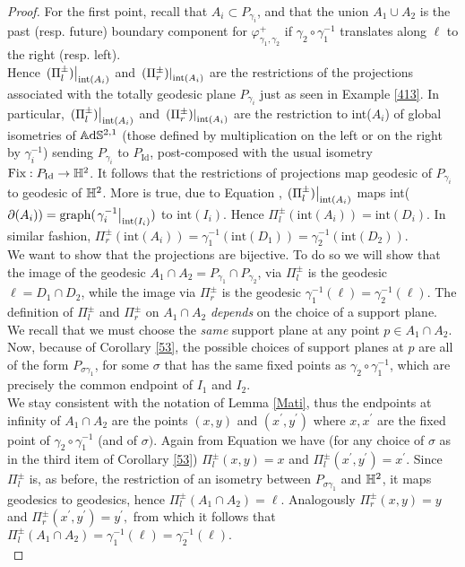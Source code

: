 \begin{proof}
    For the first point, recall that $A_i\subset P_{\gamma_i}$, and that the union $A_1\cup A_2$ is the past (resp. future) boundary component for $\varphi_{\gamma_1,\gamma_2}^+$ if $\gamma_2\circ\gamma_1^{-1}$ translates along $\ell$ to the right (resp. left). \\
    Hence $\left.(\Pi_l^\pm)\right|_{\text{int}(A_i)}$ and $\left.(\Pi_r^\pm)\right|_{\text{int}(A_i)}$ are the restrictions of the projections associated with the totally geodesic plane $P_{\gamma_i}$ just as seen in Example \ref{413}. In particular, $\left.(\Pi_l^\pm)\right|_{\text{int}(A_i)}$ and $\left.(\Pi_r^\pm)\right|_{\text{int}(A_i)}$ are the restriction to int($A_i$) of global isometries of $\mathbb{A}\mathrm{d}\mathbb{S}^{2,1}$ (those defined by multiplication on the left or on the right by $\gamma_i^{-1}$) sending $P_{\gamma_i}$ to $P_{\text{Id}}$, post-composed with the usual isometry $\text{Fix}:P_{\text{Id}}\to\mathbb{H}^2$. It follows that the restrictions of projections map geodesic of $P_{\gamma_i}$ to geodesic of $\mathbb{H}^2$. More is true, due to Equation , $\left.(\Pi_l^\pm)\right|_{\text{int}(A_i)}$ maps int($\partial(A_i))=\text{graph(\ensuremath{\left.\gamma_i^{-1}\right|_{\text{int}(I_i)}})}$ to $\text{int}(I_i).$ Hence $\Pi_l^\pm(\text{int}(A_i))=\text{int}(D_i)$. In similar fashion, $\Pi_r^\pm(\text{int}(A_i))=\gamma_1^{-1}(\text{int}(D_1))=\gamma_2^{-1}(\text{int}(D_2)).$\\
 We want to show that the projections are bijective. To do so we will show that the image of the geodesic $A_1\cap A_2=P_{\gamma_1}\cap P_{\gamma_2}$, via $\Pi_l^\pm$ is the geodesic $\ell=D_{1}\cap D_2$, while the image via $\Pi_r^\pm$ is the geodesic $\gamma_1^{-1}(\ell)=\gamma_2^{-1}(\ell).$ The definition of $\Pi_l^\pm$ and $\Pi_r^\pm$ on $A_1\cap A_2$ \textit{depends} on the choice of a support plane. We recall that we must choose the \textit{same} support plane at any point $p\in A_1\cap A_2$. Now, because of Corollary \ref{53}, the possible choices of support planes at $p$ are all of the form $P_{\sigma\gamma_1}$, for some $\sigma$ that has the same fixed points as $\gamma_2\circ\gamma_1^{-1}$, which are precisely the common endpoint of $I_1$ and $I_2$. \\
 We stay consistent with the notation of Lemma \ref{Mati}, thus the endpoints at infinity of $A_1\cap A_2$ are the points $(x,y)$ and $(x^{\prime},y^{\prime})$ where $x,x^{\prime} $ are the fixed point of $\gamma_2\circ\gamma_1^{-1}$ (and of $\sigma)$. Again from Equation  we have (for any choice of $\sigma$ as in the third item of Corollary \ref{53}) $\Pi_l^\pm(x,y)=x$ and $\Pi_l^\pm(x^{\prime} ,y^{\prime} )=x^{\prime}.$ Since $\Pi_l^\pm$ is, as before, the restriction of an isometry between $P_{\sigma\gamma_1}$ and $\mathbb{H}^2$, it maps geodesics to geodesics, hence $\Pi_l^\pm(A_1\cap A_2)=\ell.$ Analogously $\Pi_r^\pm(x,y)=y$ and $\Pi_r^\pm(x^{\prime},y^{\prime})=y^{\prime},$ from which it follows that $\Pi_l^\pm(A_1\cap A_2)=\gamma_1^{-1}(\ell)=\gamma_2^{-1}(\ell).$ \\

\end{proof}

